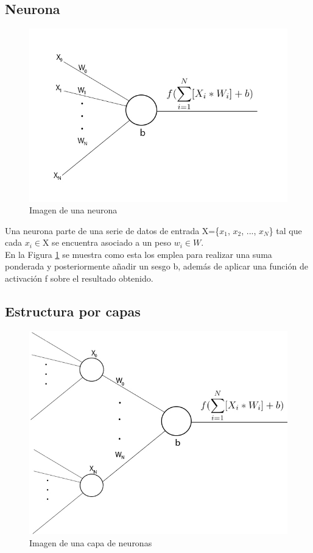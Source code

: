\subsection{Neurona}

\begin{figure}[H]
	\centering
	\includegraphics[scale=0.35]{imagenes/neurona.jpg}  
	\caption{Imagen de una neurona}
	\label{fig:neurona}
\end{figure}

Una neurona parte de una serie de datos de entrada X=\{$x_1$, $x_2$, ..., $x_N$\} tal que cada $x_i$$\in${X} se encuentra asociado a un peso $w_i\in{W}$. \\
En la Figura \ref{fig:neurona} se muestra como esta los emplea para realizar una suma ponderada y posteriormente añadir un sesgo b, además de aplicar una función de activación f sobre el resultado obtenido. 

\subsection{Estructura por capas}

\begin{figure}[H]
	\centering
	\includegraphics[scale=0.35]{imagenes/capa_neuronas.jpg}  
	\caption{Imagen de una capa de neuronas}
	\label{fig:capa_neuronas}
\end{figure}

